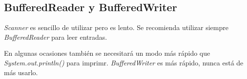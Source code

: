 \documentclass{article}
\begin{document}
\begin{multicols}{2}
	\subsection{BufferedReader y BufferedWriter}
	\emph{Scanner} es sencillo de utilizar pero es lento. Se recomienda utilizar siempre \emph{BufferedReader} para leer entradas.
	
	En algunas ocasiones también se necesitará un modo más rápido que \emph{System.out.println()} para imprimr. \emph{BufferedWriter} es más rápido, nunca está de más usarlo.
	

\end{multicols}	
\end{document}
